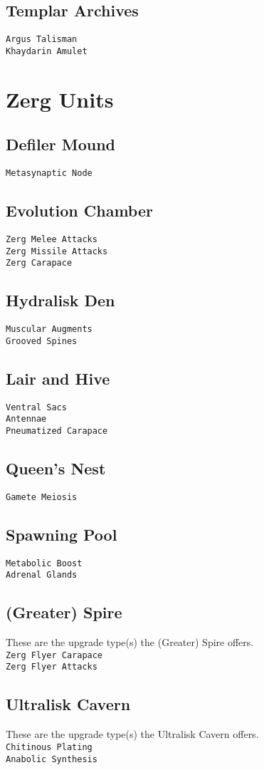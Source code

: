 \subsection{Templar Archives}
\verb|Argus Talisman|\\
\verb|Khaydarin Amulet|

\section{Zerg Units}

\subsection{Defiler Mound}
\verb|Metasynaptic Node|

\subsection{Evolution Chamber}
\verb|Zerg Melee Attacks|\\
\verb|Zerg Missile Attacks|\\
\verb|Zerg Carapace|

\subsection{Hydralisk Den}
\verb|Muscular Augments|\\
\verb|Grooved Spines|

\subsection{Lair and Hive}
\verb|Ventral Sacs| \\
\verb|Antennae|\\
\verb|Pneumatized Carapace|

\subsection{Queen's Nest}
\verb|Gamete Meiosis|

\subsection{Spawning Pool}
\verb|Metabolic Boost|\\
\verb|Adrenal Glands|

\subsection{(Greater) Spire}
These are the upgrade type(s) the (Greater) Spire offers. \\
\verb|Zerg Flyer Carapace|\\
\verb|Zerg Flyer Attacks|

\subsection{Ultralisk Cavern}
These are the upgrade type(s) the Ultralisk Cavern offers. \\
\verb|Chitinous Plating|\\
\verb|Anabolic Synthesis|
